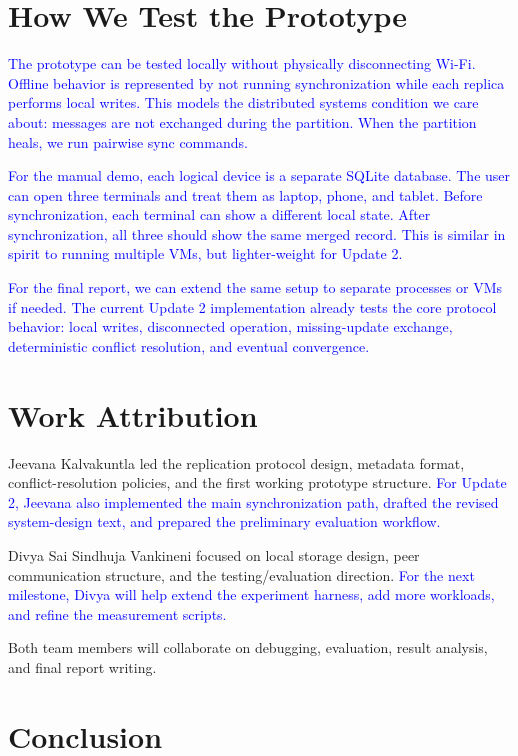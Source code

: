 \documentclass[10pt,twocolumn]{article}
\newcommand{\update}[1]{\textcolor{blue}{#1}}
\begin{document}
\section{How We Test the Prototype}

\update{The prototype can be tested locally without physically disconnecting Wi-Fi. Offline behavior is represented by not running synchronization while each replica performs local writes. This models the distributed systems condition we care about: messages are not exchanged during the partition. When the partition heals, we run pairwise sync commands.}

\update{For the manual demo, each logical device is a separate SQLite database. The user can open three terminals and treat them as laptop, phone, and tablet. Before synchronization, each terminal can show a different local state. After synchronization, all three should show the same merged record. This is similar in spirit to running multiple VMs, but lighter-weight for Update 2.}

\update{For the final report, we can extend the same setup to separate processes or VMs if needed. The current Update 2 implementation already tests the core protocol behavior: local writes, disconnected operation, missing-update exchange, deterministic conflict resolution, and eventual convergence.}

\section{Work Attribution}

Jeevana Kalvakuntla led the replication protocol design, metadata format, conflict-resolution policies, and the first working prototype structure. \update{For Update 2, Jeevana also implemented the main synchronization path, drafted the revised system-design text, and prepared the preliminary evaluation workflow.}

Divya Sai Sindhuja Vankineni focused on local storage design, peer communication structure, and the testing/evaluation direction. \update{For the next milestone, Divya will help extend the experiment harness, add more workloads, and refine the measurement scripts.}

Both team members will collaborate on debugging, evaluation, result analysis, and final report writing.

\section{Conclusion}
\end{document}
